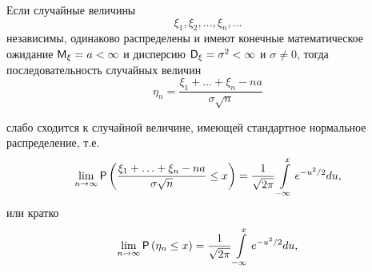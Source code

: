 \begin{theorem}
\label{th:26.3}
Если случайные величины $$\xi_1 , \xi_2 , \ldots , \xi_n , \ldots$$ независимы, одинаково распределены и имеют конечные математическое ожидание $\M_{\xi} = a < \infty$ и дисперсию $\D_{\xi} = \sigma^2 < \infty$ и $\sigma \ne 0$, тогда последовательность случайных величин
$$
\eta_n =
\frac{
	\xi_1 + \ldots + \xi_n - na
}{\sigma\sqrt{ n}}
$$

слабо сходится к случайной величине, имеющей стандартное нормальное распределение, т.е.
$$
\lim\limits_{n\to\infty}
\P\left(
	\frac{
		\xi_1 + \ldots + \xi_n - na
	}{\sigma\sqrt{ n}}\leq x
\right)
=\frac{1}{\sqrt{2\pi}}\int\limits_{-\infty}^x e^{-u^2/2} du,
$$
или кратко
$$
\lim\limits_{n\to\infty}
\P\left(
	\eta_n \leq x
\right)
=\frac{1}{\sqrt{2\pi}}\int\limits_{-\infty}^x e^{-u^2/2} du,
$$
\end{theorem}
